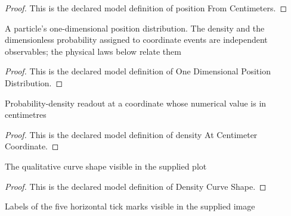 \begin{proof}
  This is the declared model definition of position From Centimeters.
\end{proof}
\begin{definition}
  \label{def:physics:phyx-mini-0653:phyxminiproblems-problemphyxmini0653-onedimensionalpositiondistribution}
  A particle's one-dimensional position distribution. The density and the dimensionless probability assigned to coordinate events are independent observables; the physical laws below relate them
\end{definition}
\begin{proof}
  This is the declared model definition of One Dimensional Position Distribution.
\end{proof}
\begin{definition}
  \label{def:physics:phyx-mini-0653:phyxminiproblems-problemphyxmini0653-densityatcentimetercoordinate}
  Probability-density readout at a coordinate whose numerical value is in centimetres
\end{definition}
\begin{proof}
  This is the declared model definition of density At Centimeter Coordinate.
\end{proof}
\begin{definition}
  \label{def:physics:phyx-mini-0653:phyxminiproblems-problemphyxmini0653-densitycurveshape}
  The qualitative curve shape visible in the supplied plot
\end{definition}
\begin{proof}
  This is the declared model definition of Density Curve Shape.
\end{proof}
\begin{definition}
  \label{def:physics:phyx-mini-0653:phyxminiproblems-problemphyxmini0653-horizontalticklabel}
  Labels of the five horizontal tick marks visible in the supplied image
\end{definition}
